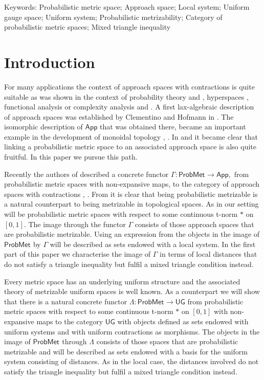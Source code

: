 \documentclass[12pt,a4paper]{amsart}
\theoremstyle{theorem}
\theoremstyle{definition}
\newcommand{\app}{\ensuremath{\mathsf{App}}}
\newcommand{\PM}{\ensuremath{\mathsf{ProbMet_{}}}}
\newcommand{\ug}{\ensuremath{\mathsf{UG}}}
\def\rw{\rightarrow}
\begin{document}
{   

 
\vspace{.8cm}

 \noindent \footnotesize {Keywords: Probabilistic metric space; Approach space; Local system; Uniform gauge space; Uniform system; Probabilistic metrizability; Category of probabilistic metric spaces; Mixed triangle inequality}\\
 

\section{Introduction}
For many applications the context of approach spaces with contractions is quite suitable as was shown in the context of probability theory \cite{BLC11} and \cite{BHSC}, hyperspaces \cite{LS}, functional analysis \cite{SV} or complexity analysis \cite{CWL} and \cite{CWS}.
A first lax-algebraic description of approach spaces was established by Clementino and Hofmann in \cite{CH}. 
The isomorphic description of $\app$ that was obtained there, became an important example in the development of monoidal topology \cite{MT}, \cite{MMECWT}. In \cite{LSY} and \cite{CL} it became clear that linking a probabilistic metric space to an associated approach space is also quite fruitful. In this paper we pursue this path.
  

Recently the authors of  \cite{LSY} described a concrete functor $\Gamma: \PM \rw \app,$ from probabilistic metric spaces with non-expansive maps, to the category of approach spaces with contractions \cite{LOW}, \cite{apox}. From \cite{LSY} it is clear that being probabilistic metrizable is a natural counterpart to being metrizable in topological spaces. As in \cite{LSY} our setting will be probabilistic metric spaces with respect to some continuous t-norm $*$ on $[0, 1].$ The image through the functor $\Gamma$ consists of those approach spaces that are probabilistic metrizable. Using an expression from \cite{LSY} the objects in the image of $\PM$ by $\Gamma$ will be described as sets endowed with a local system.
  In the first part of this paper we characterise the image of $\Gamma$ in terms of 
local distances that do not satisfy a triangle inequality but fulfil a mixed triangle condition instead.


Every metric space has an underlying uniform structure and the associated theory of metrizable uniform spaces is well known. As a counterpart we will show that there is a natural concrete functor $\Lambda: \PM \rw \ug$ from probabilistic metric spaces with respect to some continuous t-norm $*$ on $[0, 1]$ with non-expansive maps to the category $\ug$ with objects defined as sets endowed with uniform systems and with uniform contractions as morphisms. The objects in the image of $\PM$ through $\Lambda$ consists of those spaces that are probabilistic metrizable and will be described as sets endowed with a basis for the uniform system consisting of distances. As in the local case, the distances involved do not satisfy the triangle inequality but fulfil a mixed triangle condition instead.

}
\end{document}
